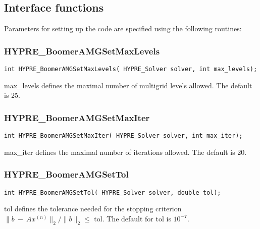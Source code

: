 
\subsection{Interface functions}

Parameters for setting up the code are specified using the following routines:

\subsubsection*{HYPRE\_BoomerAMGSetMaxLevels}
\begin{display}
\begin{verbatim}
int HYPRE_BoomerAMGSetMaxLevels( HYPRE_Solver solver, int max_levels);
\end{verbatim}
\end{display}
max\_levels defines the maximal number of multigrid levels allowed.
The default is 25.

\subsubsection*{HYPRE\_BoomerAMGSetMaxIter}
\begin{display}
\begin{verbatim}
int HYPRE_BoomerAMGSetMaxIter( HYPRE_Solver solver, int max_iter);
\end{verbatim}
\end{display}
max\_iter defines the maximal number of iterations allowed.
The default is 20.

\subsubsection*{HYPRE\_BoomerAMGSetTol}
\begin{display}
\begin{verbatim}
int HYPRE_BoomerAMGSetTol( HYPRE_Solver solver, double tol);
\end{verbatim}
\end{display}
tol defines the tolerance needed for the stopping criterion
$\| b ~ - ~ Ax^{(n)} \|_2 / \| b \|_2 \leq $ tol.
The default for tol is $10 ^{-7}$.

